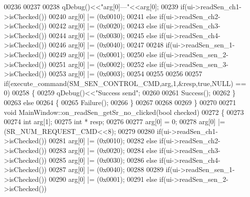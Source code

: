 \begin{DoxyCode}
00236 
00237 
00238                 qDebug()<<\textcolor{stringliteral}{"arg[0]---"}<<arg[0];
00239                 \textcolor{keywordflow}{if}(ui->readSen\_ch1->isChecked())
00240                 arg[0] |= (0x0010);
00241                 \textcolor{keywordflow}{else} \textcolor{keywordflow}{if}(ui->readSen\_ch2->isChecked())
00242                 arg[0] |= (0x0020);
00243                 \textcolor{keywordflow}{else} \textcolor{keywordflow}{if}(ui->readSen\_ch3->isChecked())
00244                 arg[0] |= (0x0030);
00245                 \textcolor{keywordflow}{else} \textcolor{keywordflow}{if}(ui->readSen\_ch4->isChecked())
00246                 arg[0] |= (0x0040);
00247 
00248                 \textcolor{keywordflow}{if}(ui->readSen\_sen\_1->isChecked())
00249                 arg[0] |= (0x0001);
00250                 \textcolor{keywordflow}{else} \textcolor{keywordflow}{if}(ui->readSen\_sen\_2->isChecked())
00251                 arg[0] |= (0x0002);
00252                 \textcolor{keywordflow}{else} \textcolor{keywordflow}{if}(ui->readSen\_sen\_3->isChecked())
00253                 arg[0] |= (0x0003);
00254 
00255 
00256 
00257                  \textcolor{keywordflow}{if}(execute\_command(SM\_SEN\_CONTROL\_CMD,arg,1,&resp,\textcolor{keyword}{true},NULL) == 0)
00258                  \{
00259                      qDebug()<<\textcolor{stringliteral}{"Success send"};
00260 
00261                     Success();
00262                  \}
00263                  \textcolor{keywordflow}{else}
00264                  \{
00265                     Failure();
00266                  \}
00267 
00268 
00269 \}
00270 
00271 \textcolor{keywordtype}{void} MainWindow::on\_readSen\_getSr\_no\_clicked(\textcolor{keywordtype}{bool} checked)
00272 \{
00273 
00274      \textcolor{keywordtype}{int} arg[1];
00275      \textcolor{keywordtype}{int} * resp;
00276 
00277     arg[0] = 0;
00278     arg[0] |= (SR\_NUM\_REQUEST\_CMD<<8);
00279 
00280     \textcolor{keywordflow}{if}(ui->readSen\_ch1->isChecked())
00281     arg[0] |= (0x0010);
00282     \textcolor{keywordflow}{else} \textcolor{keywordflow}{if}(ui->readSen\_ch2->isChecked())
00283     arg[0] |= (0x0020);
00284     \textcolor{keywordflow}{else} \textcolor{keywordflow}{if}(ui->readSen\_ch3->isChecked())
00285     arg[0] |= (0x0030);
00286     \textcolor{keywordflow}{else} \textcolor{keywordflow}{if}(ui->readSen\_ch4->isChecked())
00287     arg[0] |= (0x0040);
00288 
00289     \textcolor{keywordflow}{if}(ui->readSen\_sen\_1->isChecked())
00290     arg[0] |= (0x0001);
00291     \textcolor{keywordflow}{else} \textcolor{keywordflow}{if}(ui->readSen\_sen\_2->isChecked())

\end{DoxyCode}

